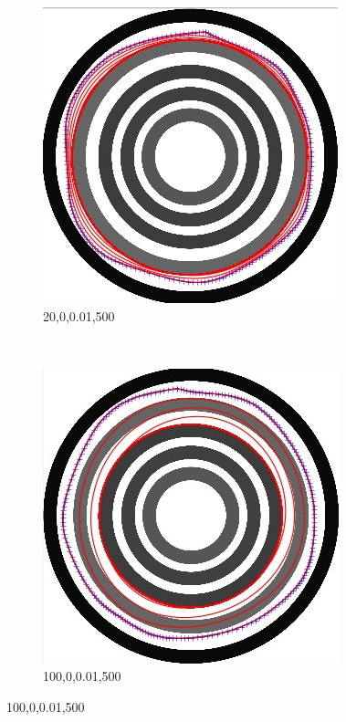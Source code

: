 \documentclass[paper=a4, fontsize=11pt]{scrartcl} %
\numberwithin{equation}{section} %
\numberwithin{figure}{section} %
\numberwithin{table}{section} %
\begin{document}
\begin{figure}[H]
        \centering
        \begin{subfigure}[b]{0.2\textwidth}
                \includegraphics[width=\textwidth]{405}
                \caption{20,0,0.01,500}
                \label{fig:Manycircles2}
        \end{subfigure}%
        ~ %
        \begin{subfigure}[b]{0.2\textwidth}
                \includegraphics[width=\textwidth]{406}
                \caption{100,0,0.01,500}
                \label{fig:Manycircles3}
        \end{subfigure}
       

\end{figure}
\end{document}
